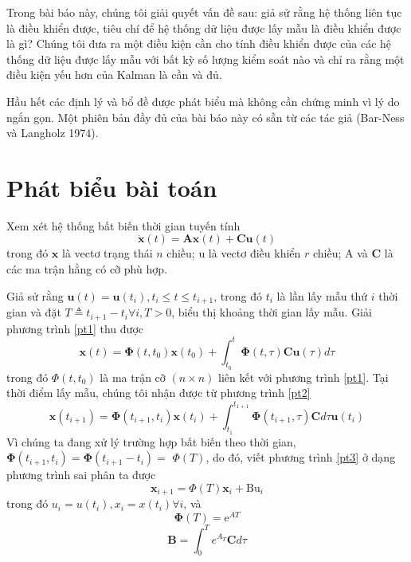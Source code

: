 \documentclass[12pt,a4paper]{article}
\begin{document}
Trong bài báo này, chúng tôi giải quyết vấn đề sau: giả sử rằng hệ thống liên tục là điều khiển được, tiêu chí để hệ thống dữ liệu được lấy mẫu là điều khiển được là gì? Chúng tôi đưa ra một điều kiện cần  cho tính điều khiển được của các hệ thống dữ liệu được lấy mẫu với bất kỳ số lượng kiểm soát nào và chỉ ra rằng một điều kiện yếu hơn của Kalman là cần và đủ.

Hầu hết các định lý và bổ đề được phát biểu mà không cần chứng minh vì lý do ngắn gọn. Một phiên bản đầy đủ của bài báo này có sẵn từ các tác giả (Bar-Ness và Langholz 1974).



\section{Phát biểu bài toán}

Xem xét hệ thống bất biến thời gian tuyến tính
\begin{equation}\tag{1}\label{pt1}
	\dot{\mathbf{x}}(t)=\mathbf{A} \mathbf{x}(t)+\mathbf{C u}(t)
\end{equation}
trong đó $\mathbf{x}$ là vectơ trạng thái $n$ chiều; $\mathrm{u}$ là  vectơ điều khiển $r$ chiều; A và $\mathbf{C}$ là các ma trận hằng có cỡ phù hợp.

Giả sử rằng $\mathbf{u}(t)=\mathbf{u}\left(t_i\right), t_i \leqslant t \leqslant t_{i+1}$, trong đó $t_i$ là lần lấy mẫu thứ $i$ thời gian và đặt $T \triangleq t_{i+1}-t_i \forall i, T>0$, biểu thị khoảng thời gian lấy mẫu. Giải phương trình \eqref{pt1} thu được
\begin{equation}\tag{2}\label{pt2}
	\mathbf{x}(t)=\boldsymbol{\Phi}\left(t, t_0\right) \mathbf{x}\left(t_0\right)+\int_{t_0}^t \boldsymbol{\Phi} (t, \tau) \mathbf{C u}(\tau) d \tau
\end{equation}
trong đó $\Phi\left(t, t_0\right)$ là ma trận cỡ $(n \times n)$ liên kết với phương trình \eqref{pt1}. Tại thời điểm lấy mẫu, chúng tôi nhận được từ phương trình \eqref{pt2}
\begin{equation}\tag{3}\label{pt3}
	\mathbf{x}\left(t_{i+1}\right)=\boldsymbol{\Phi}\left(t_{i+1}, t_i\right) \mathbf{x}\left(t_i\right) +\int_{t_1}^{t_{1+1}} \boldsymbol{\Phi}\left(t_{i+1}, \tau\right) \mathbf{C} d \tau \mathbf{u}(t_i)
\end{equation}
Vì chúng ta đang xử lý trường hợp bất biến theo thời gian, $\boldsymbol{\Phi}\left(t_{i+1}, t_i\right)=\boldsymbol{\Phi}\left(t_{i+1}-t_i \right)=$ $\Phi(T)$, do đó, viết phương trình \eqref{pt3} ở dạng phương trình sai phân ta được
\begin{equation}\tag{4}\label{pt4}
	\mathbf{x}_{i+1}=\Phi(T) \mathbf{x}_i+\mathrm{Bu}_i
\end{equation}
trong đó $u_i=u\left(t_i\right), x_i=x\left(t_i\right) \forall i$, và
\begin{equation}\tag{5}\label{pt5}
	\boldsymbol{\Phi}(T)=\mathrm{e}^{A T}
\end{equation}
\begin{equation}\tag{6}\label{pt6}
	\mathbf{B}=\int_0^T e^{A_T} \mathbf{C} d \tau
\end{equation}
\end{document}
